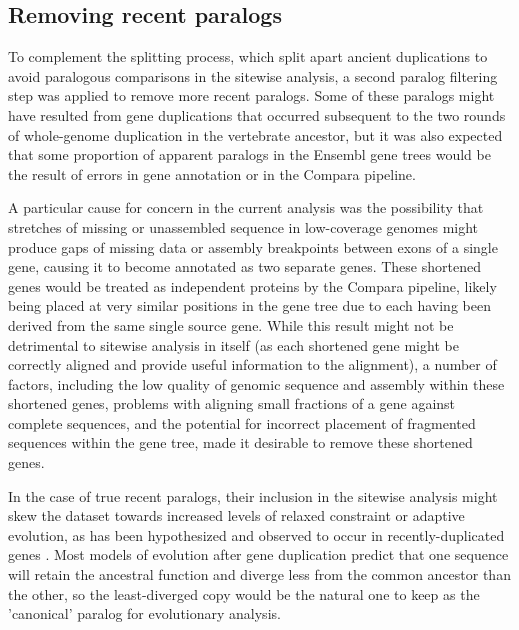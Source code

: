 
\subsection{Removing recent paralogs}

To complement the \subtr{} splitting process, which split apart
ancient duplications to avoid paralogous comparisons in the sitewise
analysis, a second paralog filtering step was applied to remove more
recent paralogs. Some of these paralogs might have resulted from gene
duplications that occurred subsequent to the two rounds of
whole-genome duplication in the vertebrate ancestor, but it was also
expected that some proportion of apparent paralogs in the Ensembl gene
trees would be the result of errors in gene annotation or in the
Compara pipeline.

A particular cause for concern in the current analysis was the
possibility that stretches of missing or unassembled sequence in
low-coverage genomes might produce gaps of missing data or assembly
breakpoints between exons of a single gene, causing it to become
annotated as two separate genes. These shortened genes would be
treated as independent proteins by the Compara pipeline, likely being
placed at very similar positions in the gene tree due to each having
been derived from the same single source gene. While this result might
not be detrimental to sitewise analysis in itself (as each shortened
gene might be correctly aligned and provide useful information to the
alignment), a number of factors, including the low quality of genomic
sequence and assembly within these shortened genes, problems with
aligning small fractions of a gene against complete sequences, and the
potential for incorrect placement of fragmented sequences within the
gene tree, made it desirable to remove these shortened genes.

In the case of true recent paralogs, their inclusion in the sitewise
analysis might skew the dataset towards increased levels of relaxed
constraint or adaptive evolution, as has been hypothesized and
observed to occur in recently-duplicated genes \citep{TODO, Lynch and
  Conery 2000}. Most models of evolution after gene duplication
predict that one sequence will retain the ancestral function and
diverge less from the common ancestor than the other, so the
least-diverged copy would be the natural one to keep as the
'canonical' paralog for evolutionary analysis.

